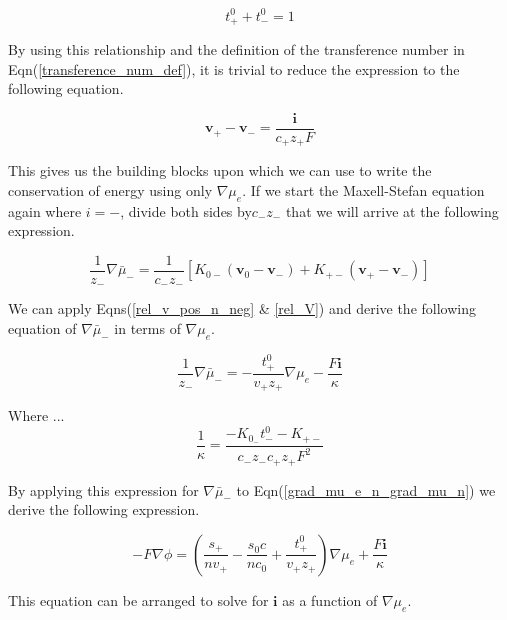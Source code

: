 \documentclass[lettersize,journal]{IEEEtran}
\begin{document}
\begin{equation}
  t_{+}^{0} + t_{-}^{0} = 1
\end{equation}

\noindent By using this relationship and the definition of the transference number in Eqn(\ref{transference_num_def}), it is trivial to reduce the expression to the following equation.



\begin{equation}\label{rel_V}
\mathbf{v}_{+}-\mathbf{v}_{-} =\frac{\mathbf{i}}{c_{+} z_{+} F}
\end{equation}

\noindent This gives us the building blocks upon which we can use to write the conservation of energy using only $\nabla \mu_e$. If we start the Maxell-Stefan equation again where $i = -$, divide both sides by$c_{-}z_{-}$ that we will arrive at the following expression.

\begin{equation}
\frac{1}{z_{-}} \nabla \bar{\mu}_{-} =\frac{1}{c_{-} z_{-}}\left[K_{0-}\left(\mathbf{v}_{0}-\mathbf{v}_{-}\right)+K_{+-}\left(\mathbf{v}_{+}-\mathbf{v}_{-}\right)\right]
\end{equation}

\noindent We can apply Eqns(\ref{rel_v_pos_n_neg} \& \ref{rel_V}) and derive the following equation of $\nabla \bar{\mu}_{-}$ in terms of $\nabla \mu_e$.

\begin{equation}
\frac{1}{z_{-}} \nabla \bar{\mu}_{-} =-\frac{t_{+}^{0}}{v_{+} z_{+}} \nabla \mu_{e}-\frac{F \mathbf{i}}{\kappa}
\end{equation}


\noindent Where ...
\begin{equation}
\frac{1}{\kappa}=\frac{-K_{0_{-}} t_{-}^{0}-K_{+-}}{c_{-} z_{-} c_{+} z_{+} F^{2}}
\end{equation}

\noindent By applying this expression for $\nabla \bar{\mu}_{-}$ to Eqn(\ref{grad_mu_e_n_grad_mu_n}) we derive the following expression.


\begin{equation}
-F \nabla \phi =\left(\frac{s_{+}}{n v_{+}}-\frac{s_{0} c}{n c_{0}}+\frac{t_{+}^{0}}{v_{+} z_{+}}\right) \nabla \mu_{e}+\frac{F \mathbf{i}}{\kappa}
\end{equation}

\noindent This equation can be arranged to solve for $\mathbf{i}$ as a function of $\nabla \mu_e$.
\end{document}
